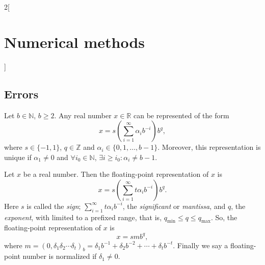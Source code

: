 \documentclass[class=article,10pt,crop=false]{standalone}
\begin{document}
\begin{multicols}{2}[\section{Numerical methods}]
\subsection{Errors}
\begin{theorem}
Let $b\in\mathbb{N}$, $b\geq 2$. Any real number $x\in\mathbb{R}$ can be represented of the form 
\begin{equation*}
    x=s\left(\sum_{i=1}^\infty\alpha_ib^{-i}\right)b^q,
\end{equation*} where $s\in\{-1,1\}$, $q\in\mathbb{Z}$ and $\alpha_i\in\{0,1,\ldots,b-1\}$. Moreover, this representation is unique if $\alpha_1\ne0$ and $\forall i_0\in\mathbb{N}$, $\exists i\geq i_0:\alpha_i\ne b-1$.
\end{theorem}
\begin{definition}
Let $x$ be a real number. Then the floating-point representation of $x$ is $$x=s\left(\sum_{i=1}^\infty t\alpha_ib^{-i}\right)b^q.$$ Here $s$ is called the \textit{sign}; $\sum_{i=1}^\infty t\alpha_ib^{-i}$, the \textit{significant} or \textit{mantissa}, and $q$, the \textit{exponent}, with limited to a prefixed range, that is, $q_\text{min}\leq q\leq q_\text{max}$. So, the floating-point representation of $x$ is $$x=smb^q,$$ where $m=(0,\delta_1\delta_2\cdots\delta_t)_b=\delta_1b^{-1}+\delta_2b^{-2}+\cdots+\delta_tb^{-t}$. Finally we say a floating-point number is normalized if $\delta_1\ne0$.
\end{definition}
\end{multicols}
\end{document}

